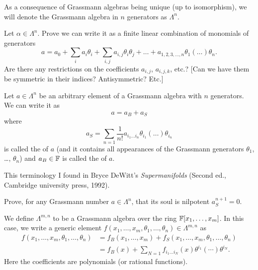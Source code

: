  As a consequence of Grassmann algebras being unique (up to
isomorphism), we will denote the Grassmann algebra in $n$ generators as $\Lambda^{n}$.

\begin{exercise}
Let $\alpha\in\Lambda^{n}$. Prove we can write it as a finite linear
combination of monomials of generators
\begin{equation}
a = a_{0} + \sum_{i}a_{i}\theta_{i} +
\sum_{i,j}a_{i,j}\theta_{i}\theta_{j} + \dots + a_{1,2,3,\dots,n}\theta_{1}(\dots)\theta_{n}.
\end{equation}
Are there any restrictions on the coefficients $a_{i,j}$, $a_{i,j,k}$,
etc.? [Can we have them be symmetric in their indices? Antisymmetric? Etc.]
\end{exercise}

\begin{definition}
Let $a\in\Lambda^{n}$ be an arbitrary element of a Grassmann algebra
with $n$ generators. We can write it as
\begin{equation}
a = a_{B} + a_{S}
\end{equation}
where
\begin{equation}
a_{S} = \sum_{n=1}\frac{1}{n!}a_{i_{1}\dots i_{n}}\theta_{i_{1}}(\dots)\theta_{i_{n}}
\end{equation}
is called the  of $a$ (and it contains all appearances of the
Grassmann generators $\theta_{1}$, \dots, $\theta_{n}$) and
$a_{B}\in\mathbb{F}$ is called the  of $a$.
\end{definition}

\begin{remark}
This terminology I found in Bryce DeWitt's \textit{Supermanifolds}
(Second ed., Cambridge university press, 1992).
\end{remark}

\begin{exercise}
Prove, for any Grassmann number $a\in\Lambda^{n}$, that its soul is nilpotent $a_{S}^{n+1}=0$.
\end{exercise}

\begin{definition}
We define $\Lambda^{m,n}$ to be a Grassmann algebra over the ring
$\mathbb{F}[x_{1},\dots,x_{m}]$. In this case, we write a generic element
$f(x_{1},\dots,x_{m},\theta_{1},\dots,\theta_{n})\in\Lambda^{m,n}$ as
\begin{equation}
  \begin{split}
  f(x_{1},\dots,x_{m},\theta_{1},\dots,\theta_{n})
&= f_{B}(x_{1},\dots,x_{m}) + f_{S}(x_{1},\dots,x_{m},\theta_{1},\dots,\theta_{n})\\
&= f_{B}(x) + \sum_{N=1}f_{i_{1}\dots i_{N}}(x)\theta^{i_{1}}(\cdots)\theta^{i_{N}}.
  \end{split}
\end{equation}
Here the coefficients are polynomials (or rational functions).
\end{definition}

